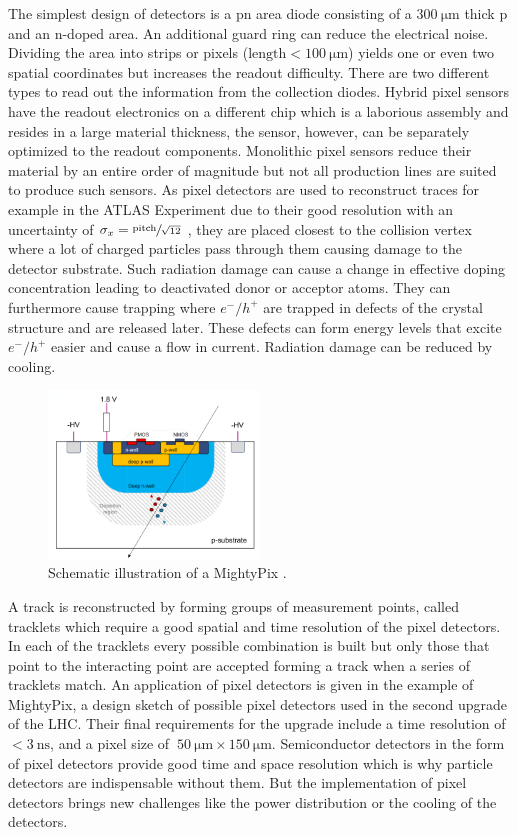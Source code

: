 The simplest design of detectors is a pn area diode consisting of a $\SI{300}{\micro\meter}$ thick p and an n-doped area.
An additional guard ring can reduce the electrical noise.
Dividing the area into strips or pixels ($\text{length}<\SI{100}{\micro\meter}$) yields one or even two spatial coordinates but increases the readout difficulty.
There are two different types to read out the information from the collection diodes.
Hybrid pixel sensors have the readout electronics on a different chip which is a laborious assembly and resides in a large material thickness, the sensor, however, can be separately optimized to the readout components.
Monolithic pixel sensors reduce their material by an entire order of magnitude but not all production lines are suited to produce such sensors.
As pixel detectors are used to reconstruct traces for example in the ATLAS Experiment due to their good resolution with an uncertainty of $\sigma_x=\sfrac{\text{pitch}}{\sqrt{12}}$ \cite{Tom}, they are placed closest to the collision vertex where a lot of charged particles pass through them causing damage to the detector substrate.
Such radiation damage can cause a change in effective doping concentration leading to deactivated donor or acceptor atoms.
They can furthermore cause trapping where $e^-/h^+$ are trapped in defects of the crystal structure and are released later.
These defects can form energy levels that excite $e^-/h^+$ easier and cause a flow in current.
Radiation damage can be reduced by cooling.
\begin{figure}
    \centering
    \includegraphics[width=0.5\textwidth]{figs/MightyPix.png}
    \caption{Schematic illustration of a MightyPix \cite{MightyPix}.}
    \label{fig:MightyPix}
\end{figure}
A track is reconstructed by forming groups of measurement points, called tracklets which require a good spatial and time resolution of the pixel detectors.
In each of the tracklets every possible combination is built but only those that point to the interacting point are accepted forming a track when a series of tracklets match.
An application of pixel detectors is given in the example of MightyPix, a design sketch of possible pixel detectors used in the second upgrade of the LHC.
Their final requirements for the upgrade include a time resolution of $<\SI{3}{\nano\second}$, and a pixel size of $~\SI{50}{\micro\meter}\times\SI{150}{\micro\meter}$.
Semiconductor detectors in the form of pixel detectors provide good time and space resolution which is why particle detectors are indispensable without them.
But the implementation of pixel detectors brings new challenges like the power distribution or the cooling of the detectors.

